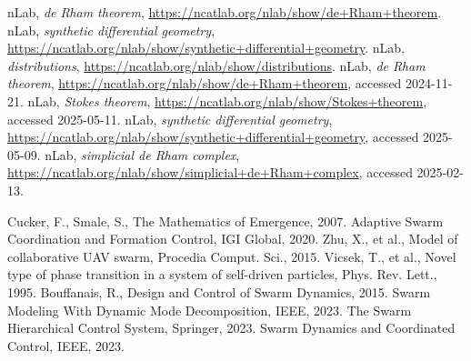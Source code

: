 \documentclass{article}
\theoremstyle{plain}
\begin{document}
\begin{thebibliography}{9}

 nLab, \emph{de Rham theorem}, \url{https://ncatlab.org/nlab/show/de+Rham+theorem}.
 nLab, \emph{synthetic differential geometry}, \url{https://ncatlab.org/nlab/show/synthetic+differential+geometry}.
 nLab, \emph{distributions}, \url{https://ncatlab.org/nlab/show/distributions}.
 nLab, \emph{de Rham theorem}, \url{https://ncatlab.org/nlab/show/de+Rham+theorem}, accessed 2024-11-21.
 nLab, \emph{Stokes theorem}, \url{https://ncatlab.org/nlab/show/Stokes+theorem}, accessed 2025-05-11.
 nLab, \emph{synthetic differential geometry}, \url{https://ncatlab.org/nlab/show/synthetic+differential+geometry}, accessed 2025-05-09.
 nLab, \emph{simplicial de Rham complex}, \url{https://ncatlab.org/nlab/show/simplicial+de+Rham+complex}, accessed 2025-02-13.

 Cucker, F., Smale, S., The Mathematics of Emergence, 2007.
 Adaptive Swarm Coordination and Formation Control, IGI Global, 2020.
 Zhu, X., et al., Model of collaborative UAV swarm, Procedia Comput. Sci., 2015.
 Vicsek, T., et al., Novel type of phase transition in a system of self-driven particles, Phys. Rev. Lett., 1995.
 Bouffanais, R., Design and Control of Swarm Dynamics, 2015.
 Swarm Modeling With Dynamic Mode Decomposition, IEEE, 2023.
 The Swarm Hierarchical Control System, Springer, 2023.
 Swarm Dynamics and Coordinated Control, IEEE, 2023.

\end{thebibliography}
\end{document}
